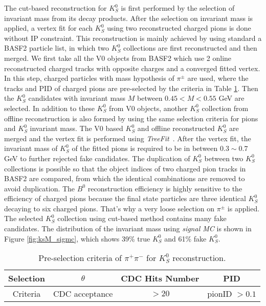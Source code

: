  The cut-based reconstruction for $K_S^0$ is first performed by the selection of invariant mass from its decay products. After the selection on invariant mass is applied, a vertex fit for each $K_S^0$ using two reconstructed charged pions is done without IP constraint. This reconstruction is mainly achieved by using standard a BASF2 particle list, in which two $K_S^0$ collections are first reconstructed and then merged. We first take all the V0 objects from BASF2 which use 2 online reconstructed charged tracks with opposite charges and a converged fitted vertex. In this step, charged particles with mass hypothesis of $\pi^{\pm}$ are used, where the tracks and PID of charged pions are pre-selected by the criteria in Table \ref{tab:kspipi_select}. Then the $K_S^0$ candidates with invariant mass $M$ between $0.45 < M < 0.55$ GeV are selected. In addition to these $K_S^0$ from V0 objects, another $K_S^0$ collection from offline reconstruction is also formed by using the same selection criteria for pions and $K_S^0$ invariant mass. The V0 based $K_S^0$ and offline reconstructed $K_S^0$ are merged and the vertex fit is performed using \textit{TreeFit}~\cite{krohn2020global}. After the vertex fit, the invariant mass of $K_S^0$ of the fitted pions is required to be in between $0.3\sim 0.7$ GeV to further rejected fake candidates. The duplication of $K_S^0$ between two $K_S^0$ collections is possible so that the object indices of two charged pion tracks in BASF2 are compared, from which the identical combinations are removed to avoid duplication. The $B^0$ reconstruction efficiency is highly sensitive to the efficiency of charged pions because the final state particles are three identical $K_S^0$ decaying to six charged pions. That's why a very loose selection on $\pi^{\pm}$ is applied. The selected $K_S^0$ collection using cut-based method contains many fake candidates. The distribution of the invariant mass using \textit{signal MC} is shown in Figure \ref{fig:ksM_sigmc}, which shows 39\% true $K_S^0$ and 61\% fake $K_S^0$.
\begin{table}[htbp]
	\centering
	\large
	\caption{Pre-selection criteria of $\pi^+ \pi^-$ for $K_S^0$ reconstruction.}
	\label{tab:kspipi_select}
	\begin{tabular}{c c c c }
		\toprule
		Selection & $\theta$ & CDC Hits Number & PID  \\
		\hline
		Criteria  & CDC acceptance &  $>20$ & pionID $> 0.1$\\
		\bottomrule
	\end{tabular}
\end{table}

